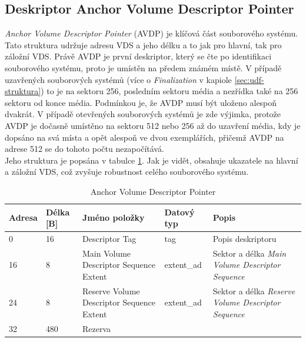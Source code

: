 \subsection{Deskriptor Anchor Volume Descriptor Pointer}
\label{subsec:avdp}
\textit{Anchor Volume Descriptor Pointer} (AVDP) je klíčová část souborového systému. Tato struktura udržuje adresu VDS a jeho délku a to jak pro hlavní, tak pro záložní VDS. Právě AVDP je první deskriptor, který se čte po identifikaci souborového systému, proto je umístěn na předem známém místě. V případě uzavřených souborových systémů (více o \textit{Finalization} v kapiole \ref{sec:udf-struktura}) to je na sektoru 256, posledním sektoru média a nezřídka také na 256 sektoru od konce média. Podmínkou je, že AVDP musí být uloženo alespoň dvakrát. V případě otevřených souborových systémů je zde výjimka, protože AVDP je dočasně umístěno na sektoru 512 nebo 256 až do uzavření média, kdy je dopsáno na svá místa a opět alespoň ve dvou exemplářích, přičemž AVDP na adrese 512 se do tohoto počtu nezapočítává.\\
Jeho struktura je popsána v tabulce \ref{tab:avdp}. Jak je vidět, obsahuje ukazatele na hlavní a záložní VDS, což zvyšuje robustnost celého souborového systému.
\begin{table}[]
    \centering
    \begin{tabular}{ | l | l | p{4.2cm} | p{1.8cm} | p{5.5cm} | }
        \hline
        Adresa  & Délka [B]   & Jméno položky & Datový typ    & Popis \\ \hline\hline
        0       & 16          & Descriptor Tag & tag        & Popis deskriptoru \\ \hline
        16      & 8           & Main Volume Descriptor Sequence Extent & extent\_ad & Sektor a délka \textit{Main Volume Descriptor Sequence} \\ \hline
        24      & 8           & Reserve Volume Descriptor Sequence Extent & extent\_ad & Sektor a délka \textit{Reserve Volume Descriptor Sequence} \\ \hline
        32      & 480         & Rezerva & & \\ \hline
    \end{tabular}
    \caption{Anchor Volume Descriptor Pointer\label{tab:avdp}}
\end{table}

